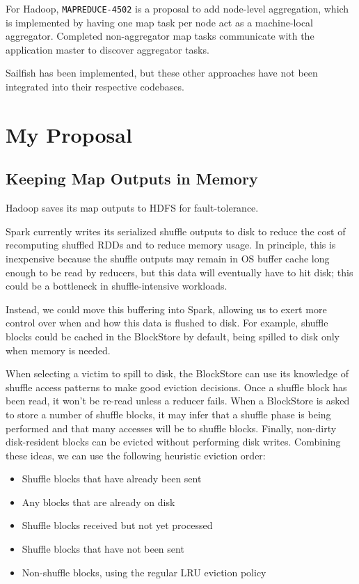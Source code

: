 \documentclass[12pt]{article}
\begin{document}
For Hadoop, \texttt{MAPREDUCE-4502} \cite{MR-4502} is a proposal to add
node-level aggregation, which is implemented by having one map task per node
act as a machine-local aggregator.  Completed non-aggregator map tasks
communicate with the application master to discover aggregator tasks.

Sailfish has been implemented, but these other approaches have not been
integrated into their respective codebases.

\section{My Proposal}

\subsection{Keeping Map Outputs in Memory}

Hadoop saves its map outputs to HDFS for fault-tolerance.

Spark currently writes its serialized shuffle outputs to disk to reduce the
cost of recomputing shuffled RDDs and to reduce memory usage.  In principle,
this is inexpensive because the shuffle outputs may remain in OS buffer cache
long enough to be read by reducers, but this data will eventually have to hit
disk; this could be a bottleneck in shuffle-intensive workloads.

Instead, we could move this buffering into Spark, allowing us to exert more
control over when and how this data is flushed to disk.  For example, shuffle
blocks could be cached in the BlockStore by default, being spilled to disk
only when memory is needed.

When selecting a victim to spill to disk, the BlockStore can use its knowledge
of shuffle access patterns to make good eviction decisions.  Once a shuffle
block has been read, it won't be re-read unless a reducer fails.  When
a BlockStore is asked to store a number of shuffle blocks, it may infer that
a shuffle phase is being performed and that many accesses will be to shuffle
blocks.  Finally, non-dirty disk-resident blocks can be evicted without
performing disk writes. Combining these ideas, we can use the following
heuristic eviction order:

\begin{itemize}
        \item Shuffle blocks that have already been sent
        \item Any blocks that are already on disk
        \item Shuffle blocks received but not yet processed
        \item Shuffle blocks that have not been sent
        \item Non-shuffle blocks, using the regular LRU eviction policy
\end{itemize}
\end{document}
